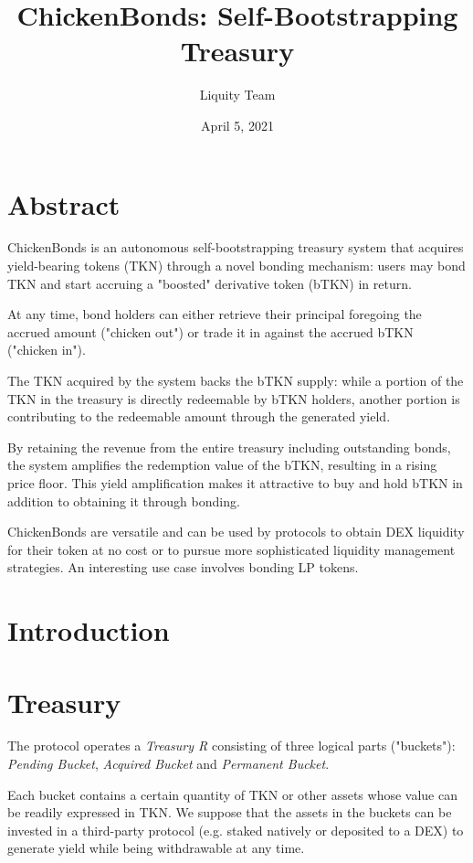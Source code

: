 \documentclass{article}
\begin{document}
\title{\textbf{ChickenBonds: Self-Bootstrapping Treasury}}
\author{Liquity Team}
\date{April 5, 2021}

\maketitle

\section*{Abstract}
ChickenBonds is an autonomous self-bootstrapping treasury system that acquires yield-bearing tokens (TKN) through a novel bonding mechanism: users may bond TKN and start accruing a "boosted" derivative token (bTKN) in return.

At any time, bond holders can either retrieve their principal foregoing the accrued amount ("chicken out") or trade it in against the accrued bTKN ("chicken in").

The TKN acquired by the system backs the bTKN supply: while a portion of the TKN in the treasury is directly redeemable by bTKN holders, another portion is contributing to the redeemable amount through the generated yield.

By retaining the revenue from the entire treasury including outstanding bonds, the system amplifies the redemption value of the bTKN, resulting in a rising price floor. This yield amplification makes it attractive to buy and hold bTKN in addition to obtaining it through bonding. 

ChickenBonds are versatile and can be used by protocols to obtain DEX liquidity for their token at no cost or to pursue more sophisticated liquidity management strategies. An interesting use case involves bonding LP tokens.

\section{Introduction}

\section{Treasury}
The protocol operates a \textit{Treasury R} consisting of three logical parts ("buckets"):  \textit{Pending Bucket}, \textit{Acquired Bucket} and \textit{Permanent Bucket}.

Each bucket contains a certain quantity of TKN or other assets whose value can be readily expressed in TKN. We suppose that the assets in the buckets can be invested in a third-party protocol (e.g. staked natively or deposited to a DEX) to generate yield while being withdrawable at any time. 
\end{document}
